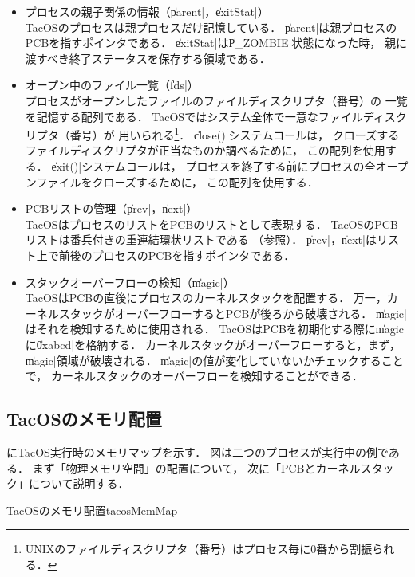 \begin{itemize}
\item プロセスの親子関係の情報（\|parent|，\|exitStat|） \\
TacOSのプロセスは親プロセスだけ記憶している．
\|parent|は親プロセスのPCBを指すポインタである．
\|exitStat|は\|P_ZOMBIE|状態になった時，
親に渡すべき終了ステータスを保存する領域である．

\item オープン中のファイル一覧（\|fds|） \\
プロセスがオープンしたファイルのファイルディスクリプタ（番号）の
一覧を記憶する配列である．
TacOSではシステム全体で一意なファイルディスクリプタ（番号）が
用いられる\footnote{
UNIXのファイルディスクリプタ（番号）はプロセス毎に0番から割振られる．}．
\|close()|システムコールは，
クローズするファイルディスクリプタが正当なものか調べるために，
この配列を使用する．
\|exit()|システムコールは，
プロセスを終了する前にプロセスの全オープンファイルをクローズするために，
この配列を使用する．

\item PCBリストの管理（\|prev|，\|next|） \\
TacOSはプロセスのリストをPCBのリストとして表現する．
TacOSのPCBリストは番兵付きの重連結環状リストである
（参照）．
\|prev|，\|next|はリスト上で前後のプロセスのPCBを指すポインタである．

\item スタックオーバーフローの検知（\|magic|） \\
TacOSはPCBの直後にプロセスのカーネルスタックを配置する．
万一，カーネルスタックがオーバーフローするとPCBが後ろから破壊される．
\|magic|はそれを検知するために使用される．
TacOSはPCBを初期化する際に\|magic|に\|0xabcd|を格納する．
カーネルスタックがオーバーフローすると，まず，\|magic|領域が破壊される．
\|magic|の値が変化していないかチェックすることで，
カーネルスタックのオーバーフローを検知することができる．
\end{itemize}

\subsection{TacOSのメモリ配置}
にTacOS実行時のメモリマップを示す．
図は二つのプロセスが実行中の例である．
まず「物理メモリ空間」の配置について，
次に「PCBとカーネルスタック」について説明する．

{TacOSのメモリ配置}{tacosMemMap}

